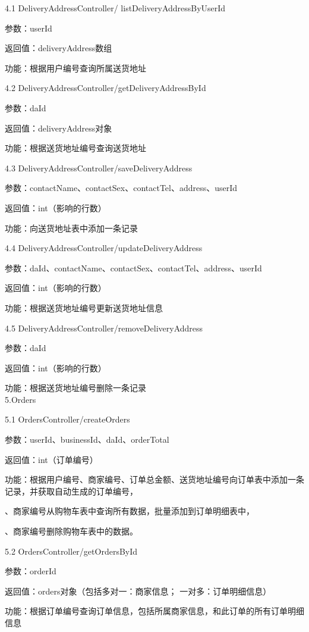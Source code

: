 4.1 DeliveryAddressController/
listDeliveryAddressByUserId 

参数：userId 

返回值：deliveryAddress数组 

功能：根据用户编号查询所属送货地址 

4.2 DeliveryAddressController/getDeliveryAddressById 

参数：daId 

返回值：deliveryAddress对象 

功能：根据送货地址编号查询送货地址 

4.3 DeliveryAddressController/saveDeliveryAddress 

参数：contactName、contactSex、contactTel、address、userId 

返回值：int（影响的行数） 

功能：向送货地址表中添加一条记录 

4.4 DeliveryAddressController/updateDeliveryAddress 

参数：daId、contactName、contactSex、contactTel、address、userId 

返回值：int（影响的行数） 

功能：根据送货地址编号更新送货地址信息

4.5 DeliveryAddressController/removeDeliveryAddress 

参数：daId 

返回值：int（影响的行数） 

功能：根据送货地址编号删除一条记录 ~\\

5.Orders 

5.1 OrdersController/createOrders 

参数：userId、businessId、daId、orderTotal 

返回值：int（订单编号） 

功能：根据用户编号、商家编号、订单总金额、送货地址编号向订单表中添加一条记录，并获取自动生成的订单编号， 

\qquad{}、商家编号从购物车表中查询所有数据，批量添加到订单明细表中， 

\qquad{}、商家编号删除购物车表中的数据。 

5.2 OrdersController/getOrdersById 

参数：orderId 

返回值：orders对象（包括多对一：商家信息； 一对多：订单明细信息） 

功能：根据订单编号查询订单信息，包括所属商家信息，和此订单的所有订单明细信息 

